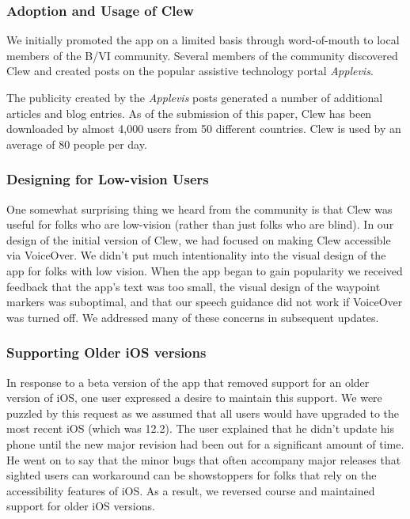 \documentclass[chi_draft]{sigchi}
\newcommand{\BVI}{B/VI\xspace}
\begin{document}
\subsubsection{Adoption and Usage of Clew}

We initially promoted the app on a limited basis through word-of-mouth to local members of the \BVI community.  Several members of the community discovered Clew and created posts on the popular assistive technology portal \emph{Applevis}.

The publicity created by the \emph{Applevis} posts generated a number of additional articles and blog entries.  As of the submission of this paper, Clew has been downloaded by almost 4,000 users from 50 different countries.  Clew is used by an average of 80 people per day.


\subsubsection{Designing for Low-vision Users}
One somewhat surprising thing we heard from the community is that Clew was useful for folks who are low-vision (rather than just folks who are blind).  In our design of the initial version of Clew, we had focused on making Clew  accessible via VoiceOver.  We didn't put much intentionality into the visual design of the app for folks with low vision.  When the app began to gain popularity we received feedback that the app's text was too small, the visual design of the waypoint markers was suboptimal, and that our speech guidance did not work if VoiceOver was turned off.  We addressed many of these concerns in subsequent updates.

\subsubsection{Supporting Older iOS versions}

In response to a beta version of the app that removed support for an older version of iOS, one user expressed a desire to maintain this support.  We were puzzled by this request as we assumed that all users would have upgraded to the most recent iOS (which was 12.2).  The user explained that he didn't update his phone until the new major revision had been out for a significant amount of time.  He went on to say that the minor bugs that often accompany major releases that sighted users can workaround can be showstoppers for folks that rely on the accessibility features of iOS.  As a result, we reversed course and maintained support for older iOS versions.
\end{document}
